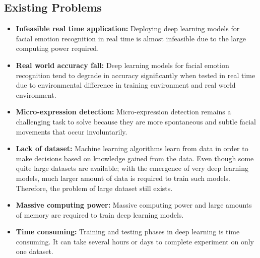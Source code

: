 \documentclass[master]{thesis-uestc}
\begin{document}
\subsection*{Existing Problems}
\begin{itemize}
    \item \textbf{Infeasible real time application:} Deploying deep learning models for facial emotion recognition in real time is almost infeasible due to the large computing power required.
    \item \textbf{Real world accuracy fall:} Deep learning models for facial emotion recognition tend to degrade in accuracy significantly when tested in real time due to environmental difference in training environment and real world environment.
    \item \textbf{Micro-expression detection:} Micro-expression detection remains a challenging task to solve because they are more spontaneous and subtle facial movements that occur involuntarily.
    \item \textbf{Lack of dataset: }Machine learning algorithms learn from data in order to make decisions based on knowledge gained from the data. Even though some quite large datasets are available; with the emergence of very deep learning models, much larger amount of data is required to train such models. Therefore, the problem of large dataset still exists.
    \item\textbf{ Massive computing power:} Massive computing power and large amounts of memory are required to train deep learning models.
    \item \textbf{Time consuming:} Training and testing phases in deep learning is time consuming. It can take several hours or days to complete experiment on only one dataset.
\end{itemize}
\end{document}

